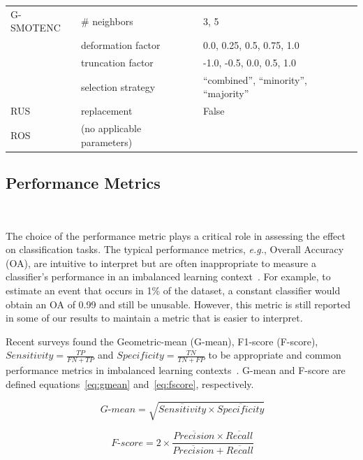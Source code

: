 \documentclass[preprint,12pt]{elsarticle}
\begin{document}
{\begin{table}[ht]
\begin{tabular}{lll}
		G-SMOTENC       & \# neighbors                     & 3, 5                           \\
                        & deformation factor               & 0.0, 0.25, 0.5, 0.75, 1.0      \\
                        & truncation factor                & -1.0, -0.5, 0.0, 0.5, 1.0      \\
                        & selection strategy               & ``combined'',
                        ``minority'', ``majority''\\
		RUS             & replacement                      & False                          \\
		ROS             & (no applicable parameters)       &                                \\
		\bottomrule
	\end{tabular}
\end{table}

\subsection{Performance Metrics}~\label{sec:performance_metrics}

The choice of the performance metric plays a critical role in assessing
the effect on classification tasks. The typical performance metrics,
\textit{e.g.}, Overall Accuracy (OA), are intuitive to interpret but are often
inappropriate to measure a classifier's performance in an imbalanced learning
context~\cite{sun2009classification}. For example, to estimate an event that
occurs in 1\% of the dataset, a constant classifier would obtain an OA of 0.99
and still be unusable. However, this metric is still reported in some of our
results to maintain a metric that is easier to interpret.

Recent surveys found the Geometric-mean (G-mean), F1-score
(F-score), $Sensitivity = \frac{TP}{FN+TP}$ and $Specificity = \frac{TN}{TN +
FP}$ to be appropriate and common performance metrics in imbalanced learning
contexts~\cite{rout2018handling, jeni2013facing,
japkowicz2013assessment}. G-mean and F-score are defined
equations~\ref{eq:gmean} and~\ref{eq:fscore}, respectively.

\begin{equation}~\label{eq:gmean}
    \ensuremath{\textit{G-mean}} = \sqrt{\overline{Sensitivity} \times
    \overline{Specificity}}
\end{equation}

\begin{equation}~\label{eq:fscore}
    \ensuremath{\textit{F-score}} = 2\times\frac{\overline{Precision} \times
    \overline{Recall}}{\overline{Precision} + \overline{Recall}}
\end{equation}

}
\end{document}
